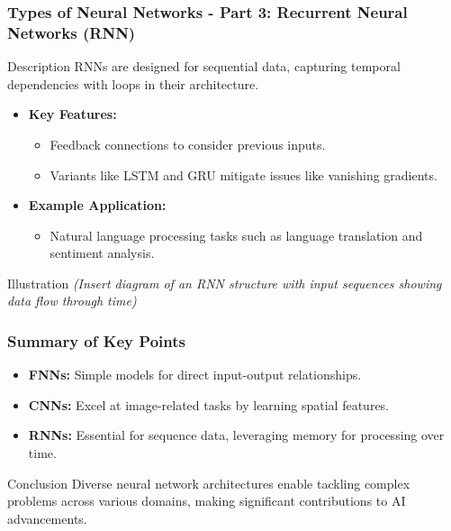 \documentclass[aspectratio=169]{beamer}
\begin{document}
\begin{frame}[fragile]
  \frametitle{Types of Neural Networks - Part 3: Recurrent Neural Networks (RNN)}
  \begin{block}{Description}
    RNNs are designed for sequential data, capturing temporal dependencies with loops in their architecture.
  \end{block}

  \begin{itemize}
    \item \textbf{Key Features:}
      \begin{itemize}
        \item Feedback connections to consider previous inputs.
        \item Variants like LSTM and GRU mitigate issues like vanishing gradients.
      \end{itemize}

    \item \textbf{Example Application:}
      \begin{itemize}
        \item Natural language processing tasks such as language translation and sentiment analysis.
      \end{itemize}
  \end{itemize}

  \begin{block}{Illustration}
    \textit{(Insert diagram of an RNN structure with input sequences showing data flow through time)}
  \end{block}
\end{frame}

\begin{frame}[fragile]
  \frametitle{Summary of Key Points}
  \begin{itemize}
    \item \textbf{FNNs:} Simple models for direct input-output relationships.
    \item \textbf{CNNs:} Excel at image-related tasks by learning spatial features.
    \item \textbf{RNNs:} Essential for sequence data, leveraging memory for processing over time.
  \end{itemize}

  \begin{block}{Conclusion}
    Diverse neural network architectures enable tackling complex problems across various domains, making significant contributions to AI advancements.
  \end{block}
\end{frame}
\end{document}
